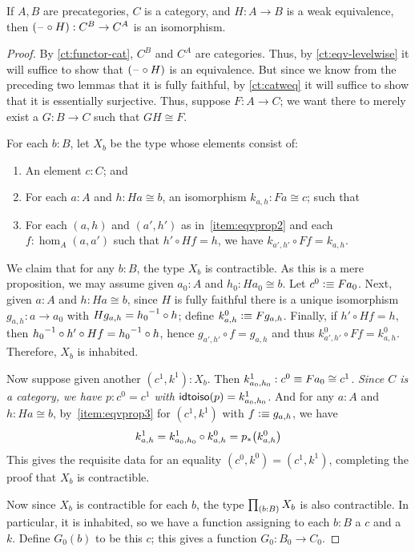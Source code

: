 \begin{thm}\label{ct:cat-weq-eq}
  If $A,B$ are precategories, $C$ is a category, and $H:A\to B$ is a weak equivalence, then $(\mathord{\hspace{1pt}\text{--}\hspace{1pt}}\circ H):C^B \to C^A$ is an isomorphism.
\end{thm}
\begin{proof}
  By \cref{ct:functor-cat}, $C^B$ and $C^A$ are categories.
  Thus, by \cref{ct:eqv-levelwise} it will suffice to show that $(\mathord{\hspace{1pt}\text{--}\hspace{1pt}}\circ H)$ is an equivalence.
  But since we know from the preceding two lemmas that it is fully faithful, by \cref{ct:catweq} it will suffice to show that it is essentially surjective.
  Thus, suppose $F:A\to C$; we want there to merely exist a $G:B\to C$ such that $GH\cong F$.

  For each $b:B$, let $X_b$ be the type whose elements consist of:
  \begin{enumerate}
  \item An element $c:C$; and
  \item For each $a:A$ and $h:Ha\cong b$, an isomorphism $k_{a,h}:Fa\cong c$; such that\label{item:eqvprop2}
  \item For each $(a,h)$ and $(a',h')$ as in~\ref{item:eqvprop2} and each $f:\hom_A(a,a')$ such that $h'\circ Hf = h$, we have $k_{a',h'}\circ Ff = k_{a,h}$.\label{item:eqvprop3}
  \end{enumerate}
  We claim that for any $b:B$, the type $X_b$ is contractible.
  As this is a mere proposition, we may assume given $a_0:A$ and $h_0:Ha_0 \cong b$.
  Let $c^0\vcentcolon\equiv Fa_0$.
  Next, given $a:A$ and $h:Ha\cong b$, since $H$ is fully faithful there is a unique isomorphism $g_{a,h}:a\to a_0$ with $Hg_{a,h} = {h_0}^{-1}\circ h$; define $k^0_{a,h} \vcentcolon\equiv Fg_{a,h}$.
  Finally, if $h'\circ Hf = h$, then ${h_0}^{-1}\circ h'\circ Hf = {h_0}^{-1}\circ h$, hence $g_{a',h'} \circ f = g_{a,h}$ and thus $k^0_{a',h'}\circ Ff = k^0_{a,h}$.
  Therefore, $X_b$ is inhabited.

  Now suppose given another $(c^1,k^1): X_b$.
  Then $k^1_{a_0,h_0}:c^0 \equiv Fa_0 \cong c^1$.
  \emph{Since $C$ is a category, we have $p:c^0=c^1$ with $\mathsf{idtoiso}(p) = k^1_{a_0,h_0}$.}
  And for any $a:A$ and $h:Ha\cong b$, by~\ref{item:eqvprop3} for $(c^1,k^1)$ with $f\vcentcolon\equiv g_{a,h}$, we have
  \[k^1_{a,h} = k^1_{a_0,h_0} \circ k^0_{a,h} = {p}_{*}\mathopen{}\left({k^0_{a,h}}\right)\mathclose{}\]
  This gives the requisite data for an equality $(c^0,k^0)=(c^1,k^1)$, completing the proof that $X_b$ is contractible.

  Now since $X_b$ is contractible for each $b$, the type $\prd{b:B} X_b$ is also contractible.
  In particular, it is inhabited, so we have a function assigning to each $b:B$ a $c$ and a $k$.
  Define $G_0(b)$ to be this $c$; this gives a function $G_0 :B_0 \to C_0$.


\end{proof}
